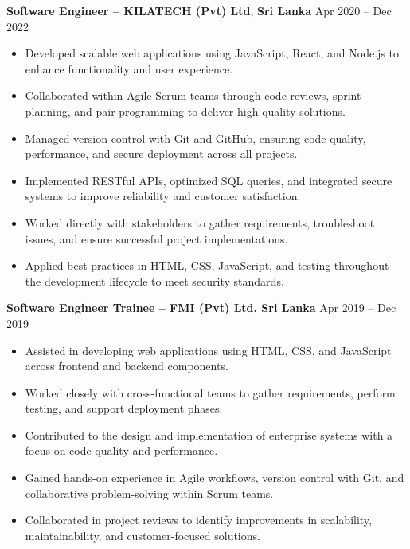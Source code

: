\documentclass[10pt,letterpaper]{article}
\begin{document}
\vspace{-2pt}

\textbf{Software Engineer -- KILATECH (Pvt) Ltd}, \textbf{Sri Lanka} \hfill Apr 2020 -- Dec 2022

\vspace{-1pt}

\begin{itemize}
\item Developed scalable web applications using JavaScript, React, and Node.js to enhance functionality and user experience.
\item Collaborated within Agile Scrum teams through code reviews, sprint planning, and pair programming to deliver high-quality solutions.
\item Managed version control with Git and GitHub, ensuring code quality, performance, and secure deployment across all projects.
\item Implemented RESTful APIs, optimized SQL queries, and integrated secure systems to improve reliability and customer satisfaction.
\item Worked directly with stakeholders to gather requirements, troubleshoot issues, and ensure successful project implementations.
\item Applied best practices in HTML, CSS, JavaScript, and testing throughout the development lifecycle to meet security standards.
\end{itemize}

\textbf{Software Engineer Trainee -- FMI (Pvt) Ltd, Sri Lanka} \hfill Apr 2019 -- Dec 2019

\vspace{-1pt}

\begin{itemize}
\item Assisted in developing web applications using HTML, CSS, and JavaScript across frontend and backend components.
\item Worked closely with cross-functional teams to gather requirements, perform testing, and support deployment phases.
\item Contributed to the design and implementation of enterprise systems with a focus on code quality and performance.
\item Gained hands-on experience in Agile workflows, version control with Git, and collaborative problem-solving within Scrum teams.
\item Collaborated in project reviews to identify improvements in scalability, maintainability, and customer-focused solutions.
\end{itemize}
\end{document}
